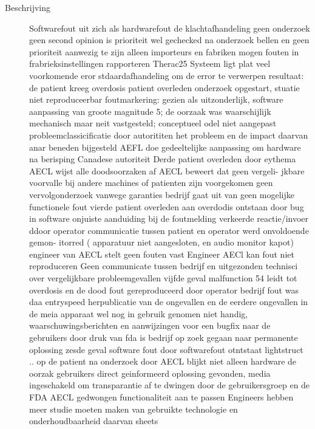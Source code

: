 \begin{description}
	\item[Beschrijving]
	
	Softwarefout uit zich als hardwarefout de klachtafhandeling geen onderzoek geen second opinion is prioriteit wel 
	gechecked na onderzoek bellen en geen prioriteit aanwezig te zijn alleen importeurs en fabriken mogen fouten 
	in frabrieksinstellingen rapporteren 
	Therac25 Systeem ligt plat veel voorkomende eror stdaardafhandeling om de error te verwerpen resultaat: 
	de patient kreeg overdosis patient overleden onderzoek opgestart, stuatie niet reproduceerbar foutmarkering: 
	gezien als uitzonderlijk, software aanpassing van groote magnitude 5; de oorzaak was waarschijlijk mechanisch 
	maar neit vastgesteld; conceptueel odel niet aangepast probleemclassicificatie door autorititen het probleem 
	en de impact daarvan anar beneden bijgesteld AEFL doe gedeeltelijke aanpassing om hardware na berisping 
	Canadese autoriteit 
	Derde patient overleden door eythema AECL wijst alle doodsoorzaken af AECL beweert dat geen vergeli- 
	jkbare voorvalle bij andere machines of patienten zijn voorgekomen geen vervolgonderzoek vanwege garanties 
	bedrijf gaat uit van geen mogelijke functionele fout 
	vierde patient overleden aan overdodis ontstaan door bug in software onjuiste aanduiding bij de foutmelding 
	verkeerde reactie/invoer ddoor operator communicatie tussen patient en operator werd onvoldoende gemon- 
	itorred ( apparatuur niet aangesloten, en audio monitor kapot) engineer van AECL stelt geen fouten vast 
	Engineer AECl kan fout niet reproduceren Geen communicate tussen bedrijf en uitgezonden technisci over 
	vergelijkbare probleemgevallen 
	vijfde geval malfunction 54 leidt tot overdosis en de dood fout gereproduceerd door operator bedrijf fout 
	was daa entryspeed herpublicatie van de ongevallen en de eerdere ongevallen in de meia apparaat wel nog in 
	gebruik genomen niet handig, waarschuwingsberichten en aanwijzingen voor een bugfix naar de gebruikers door 
	druk van fda is bedrijf op zoek gegaan naar permanente oplossing 
	zesde geval software fout door softwarefout otntstaat lightstruct .. op de patient na onderzoek door AECL 
	blijkt niet alleen hardware de oorzak gebruikers direct geinformeerd oplossing gevonden, media ingeschakeld om transparantie af te dwingen door de gebruikersgroep en de FDA AECL gedwongen functionaliteit aan te passen 
	Engineers hebben meer studie moeten maken van gebruikte technologie en onderhoudbaarheid daarvan 
	sheets
	\cite{rogaway2004therac25}
	~\cite{wikiTherac25}

\end{description}
